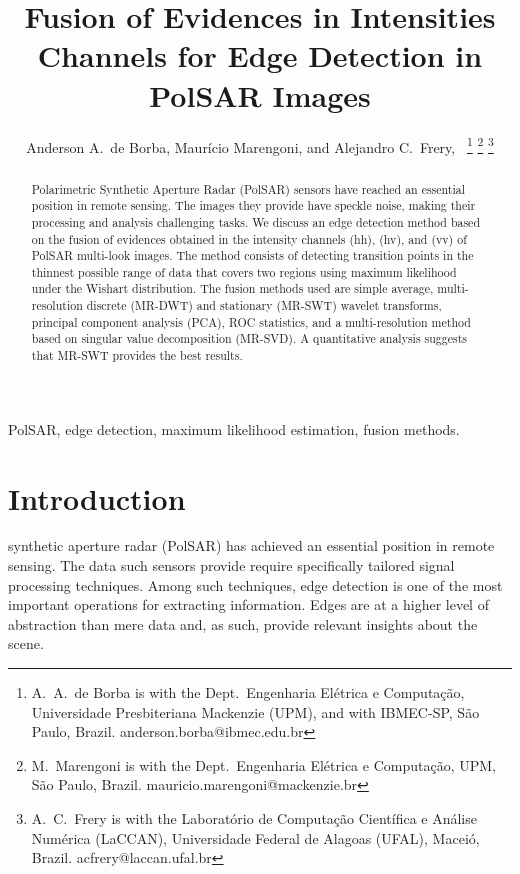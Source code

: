 \documentclass[journal]{IEEEtran}
\begin{document}
\title{Fusion of Evidences in Intensities Channels for Edge Detection in PolSAR Images}
\author{Anderson A.\ de Borba, Maurício Marengoni, and Alejandro C.\ Frery,~%
\thanks{A.\ A.\ de Borba is with the Dept.\ Engenharia Elétrica e Computação, Universidade Presbiteriana Mackenzie (UPM), and with IBMEC-SP, São Paulo, Brazil. anderson.borba@ibmec.edu.br}
\thanks{M.\ Marengoni is with the Dept.\ Engenharia Elétrica e Computação,
UPM, São Paulo, Brazil. mauricio.marengoni@mackenzie.br}
\thanks{A.\ C.\ Frery is with the Laboratório de Computação Científica e Análise Numérica (LaCCAN), Universidade Federal de Alagoas (UFAL), Maceió, Brazil. acfrery@laccan.ufal.br}}

\maketitle

\begin{abstract}
Polarimetric Synthetic Aperture Radar (PolSAR) sensors have reached an essential position in remote sensing. 
The images they provide have speckle noise, making their processing and analysis challenging tasks. 
We discuss an edge detection method based on the fusion of evidences obtained in the intensity channels (hh), (hv), and (vv) of PolSAR multi-look images. 
The method consists of detecting transition points in the thinnest possible range of data that covers two regions using maximum likelihood under the Wishart distribution. 
The fusion methods used are 
simple average, 
multi-resolution discrete (MR-DWT) and 
stationary (MR-SWT) wavelet transforms, 
principal component analysis (PCA), 
ROC statistics, 
and a multi-resolution method based on singular value decomposition (MR-SVD). 
A quantitative analysis suggests that MR-SWT provides the best results.
\end{abstract}

\begin{IEEEkeywords}
PolSAR, edge detection, maximum likelihood estimation, fusion methods. 
\end{IEEEkeywords}

\section{Introduction}\label{sec_01}
 synthetic aperture radar (PolSAR) has achieved an essential position in remote sensing. 
The data such sensors provide require specifically tailored signal processing techniques.
Among such techniques, edge detection is one of the most important operations for extracting information.
Edges are at a higher level of abstraction than mere data and, as such, provide relevant insights about the scene.
\end{document}
